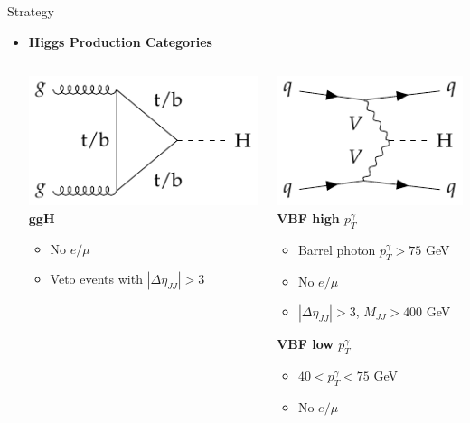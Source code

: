 \documentclass[9pt,aspectratio=1610]{beamer}
\newcommand{\khl}[1]{\textbf{\color{structure}#1}}
\begin{document}
\begin{frame}{Strategy}
	\begin{itemize}
		\item \khl{Higgs Production Categories}
		\vspace{1em}
		\begin{columns}
			\centering
			\begin{column}{0.31\textwidth}
				\centering
				\includegraphics[height=0.25\textheight]{feynman-diagrams/ggH.pdf}\\
				\textbf{ggH}
				\begin{itemize}
					\item No \(e/\mu\)
					\item Veto events with \(|\Delta\eta_{JJ}| > 3\)
				\end{itemize}
			\end{column}
			\begin{column}{0.31\textwidth}
				\centering
				\includegraphics[height=0.25\textheight]{feynman-diagrams/VBF.pdf}\\
				\textbf{VBF high \(p_T^\gamma\)}
				\begin{itemize}
					\item Barrel photon \(p_T^\gamma > 75\) GeV
					\item No \(e/\mu\)
					\item \(|\Delta\eta_{JJ}| > 3\), \(M_{JJ} > 400\) GeV
				\end{itemize}
				\vspace{1em}
				\textbf{VBF low \(p_T^\gamma\)}
				\begin{itemize}
					\item \(40 < p_T^\gamma < 75\) GeV
					\item No \(e/\mu\)

\end{itemize}
\end{column}
\end{columns}
\end{itemize}
\end{frame}
\end{document}
